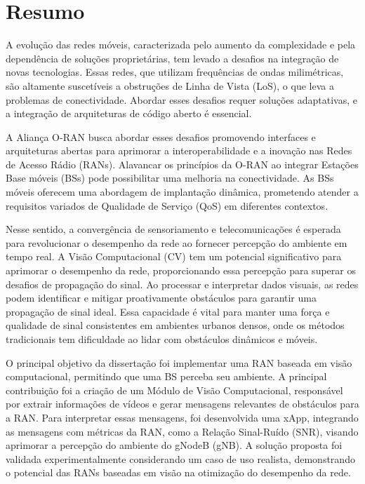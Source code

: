 \chapter*{Resumo}
A evolução das redes móveis, caracterizada pelo aumento da complexidade e pela dependência de soluções proprietárias, tem levado a desafios na integração de novas tecnologias.
Essas redes, que utilizam frequências de ondas milimétricas, são altamente suscetíveis a obstruções de Linha de Vista (LoS), o que leva a problemas de conectividade.
Abordar esses desafios requer soluções adaptativas, e a integração de arquiteturas de código aberto é essencial.

A Aliança O-RAN busca abordar esses desafios promovendo interfaces e arquiteturas abertas para aprimorar a interoperabilidade e a inovação nas Redes de Acesso Rádio (RANs).
Alavancar os princípios da O-RAN ao integrar Estações Base móveis (BSs) pode possibilitar uma melhoria na conectividade.
As BSs móveis oferecem uma abordagem de implantação dinâmica, prometendo atender a requisitos variados de Qualidade de Serviço (QoS) em diferentes contextos.

Nesse sentido, a convergência de sensoriamento e telecomunicações é esperada para revolucionar o desempenho da rede ao fornecer percepção do ambiente em tempo real.
A Visão Computacional (CV) tem um potencial significativo para aprimorar o desempenho da rede, proporcionando essa percepção para superar os desafios de propagação do sinal.
Ao processar e interpretar dados visuais, as redes podem identificar e mitigar proativamente obstáculos para garantir uma propagação de sinal ideal.
Essa capacidade é vital para manter uma força e qualidade de sinal consistentes em ambientes urbanos densos, onde os métodos tradicionais tem dificuldade ao lidar com obstáculos dinâmicos e móveis.

O principal objetivo da dissertação foi implementar uma RAN baseada em visão computacional, permitindo que uma BS perceba seu ambiente.
A principal contribuição foi a criação de um Módulo de Visão Computacional, responsável por extrair informações de vídeos e gerar mensagens relevantes de obstáculos para a RAN\@.
Para interpretar essas mensagens, foi desenvolvida uma xApp, integrando as mensagens com métricas da RAN, como a Relação Sinal-Ruído (SNR), visando aprimorar a percepção do ambiente do gNodeB (gNB).
A solução proposta foi validada experimentalmente considerando um caso de uso realista, demonstrando o potencial das RANs baseadas em visão na otimização do desempenho da rede.